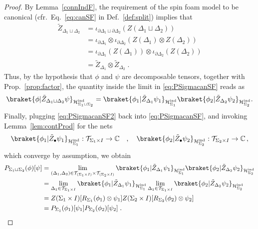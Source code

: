 \documentclass[11pt]{article}
\newcommand{\C}{\mathbb{C}}
\newcommand{\h}{\mathcal{H}}
\theoremstyle{definition}
\numberwithin{equation}{section}
\begin{document}
\begin{proof}
    By Lemma~\ref{connIndF}, the requirement of the spin foam model to be canonical (cfr.~Eq.~\eqref{eq:canSF} in Def.~\ref{def:split}) implies that
     \begin{equation}
     \begin{split}
        \tilde{Z}_{\Delta_1\sqcup\Delta_2}&=\iota_{\partial\Delta_1\sqcup\partial\Delta_2}(Z(\Delta_1\sqcup\Delta_2))\\
        &=\iota_{\partial\Delta_1}\otimes\iota_{\partial\Delta_2}(Z(\Delta_1)\otimes Z(\Delta_2))\\
        &=\iota_{\partial\Delta_1}(Z(\Delta_1))\otimes\iota_{\partial\Delta_2}(Z(\Delta_2))\\
        &=\tilde Z_{\Delta_1}\otimes\tilde Z_{\Delta_2}\;.
     \end{split}
    \end{equation}
    Thus, by the hypothesis that $\phi$ and $\psi$ are decomposable tensors, together with Prop.~\ref{prop:factor}, the quantity inside the limit in \eqref{eq:PSigmacanSF} reads as
    \begin{equation}\label{eq:PSigmacanSF2}
        \braket{\phi|\tilde{Z}_{\Delta_1\sqcup\Delta_2}\psi}_{\h^{\rm ind}_{\Sigma_1\sqcup\Sigma_2}}=\braket{\phi_1|\tilde{Z}_{\Delta_1}\psi_1}_{\h^{\rm ind}_{\Sigma_1}}\braket{\phi_2|\tilde{Z}_{\Delta_2}\psi_2}_{\h^{\rm ind}_{\Sigma_2}}.
    \end{equation}
    Finally, plugging \eqref{eq:PSigmacanSF2} back into \eqref{eq:PSigmacanSF}, and invoking Lemma~\ref{lem:contProd} for the nets
    \[\braket{\phi_1|\tilde{Z}_{\bullet}\psi_1}_{\h^{\rm ind}_{\Sigma_1}}:\mathcal{T}_{\Sigma_1\times I}\to\C\quad,\quad
        \braket{\phi_2|\tilde{Z}_{\bullet}\psi_2}_{\h^{\rm ind}_{\Sigma_2}}:\mathcal{T}_{\Sigma_2\times I}\to\C\,,\]
    which converge by assumption, we obtain
    \begin{equation}
    \begin{split}
        P_{\Sigma_1\sqcup\Sigma_2}(\phi)[\psi]&=\lim_{(\Delta_1,\Delta_2)\in\mathcal{T}_{(\Sigma_1\times I)}\times\mathcal{T}_{(\Sigma_2\times I)}}\braket{\phi_1|\tilde{Z}_{\Delta_1}\psi_1}_{\h^{\rm ind}_{\Sigma_1}}\braket{\phi_2|\tilde{Z}_{\Delta_2}\psi_2}_{\h^{\rm ind}_{\Sigma_2}}\\
        &=\lim_{\Delta_1\in\mathcal{T}_{\Sigma_1\times I}}\braket{\phi_1|\tilde{Z}_{\Delta_1}\psi_1}_{\h^{\rm ind}_{\Sigma_1}}\lim_{\Delta_1\in\mathcal{T}_{\Sigma_1\times I}}\braket{\phi_2|\tilde{Z}_{\Delta_2}\psi_2}_{\h^{\rm ind}_{\Sigma_2}}\\
        &=Z(\Sigma_1\times I)[R_{\Sigma_1}(\phi_1)\otimes\psi_1]Z(\Sigma_2\times I)[R_{\Sigma_2}(\phi_2)\otimes\psi_2]\\
        &=P_{\Sigma_1}(\phi_1)[\psi_1]P_{\Sigma_2}(\phi_2)[\psi_2]\;.
    \end{split}
    \end{equation}
\end{proof}
\end{document}
